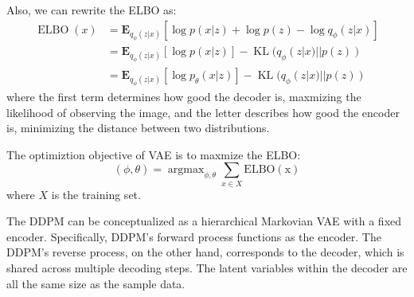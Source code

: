 \begin{theorem}
    Also, we can rewrite the ELBO as:
    \begin{equation}
        \begin{aligned}
            \operatorname{ELBO}(x) &= \mathbf{E}_{q_\phi(z|x)}\left[\log p(x|z)+\log p(z)-\log q_\phi(z|x)\right]\\
            &= \mathbf{E}_{q_\phi(z|x)}\left[\log p(x|z)\right] - \operatorname{KL}(q_\phi(z|x)||p(z))\\
            &= \mathbf{E}_{q_\phi(z|x)}\left[\log p_\theta(x|z)\right] - \operatorname{KL}(q_\phi(z|x)||p(z))
        \end{aligned}
    \end{equation}
    where the first term determines how good the decoder is, maxmizing the likelihood of observing the image, 
    and the letter describes how good the encoder is, minimizing the distance between two distributions.
\end{theorem}

\begin{definition}
    The optimiztion objective of VAE is to maxmize the ELBO:
    \begin{equation}
        (\phi, \theta) = \operatorname{argmax}_{\phi, \theta} \sum_{x\in X} \operatorname{ELBO(x)}
    \end{equation}
    where $X$ is the training set.
\end{definition}
The DDPM can be conceptualized as a hierarchical Markovian VAE with a fixed encoder. Specifically, DDPM's  forward process functions as the encoder.
The DDPM’s reverse process, on the other hand, corresponds to the decoder, which is shared across multiple  decoding steps. The latent variables within the decoder are all the same size as the sample data.